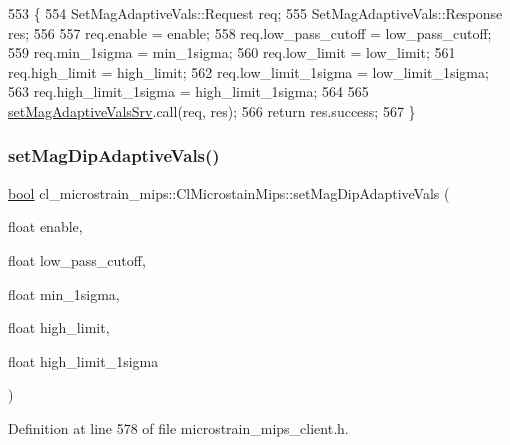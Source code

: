 \begin{DoxyCode}
553     \{
554         SetMagAdaptiveVals::Request req;
555         SetMagAdaptiveVals::Response res;
556 
557         req.enable = enable;
558         req.low\_pass\_cutoff = low\_pass\_cutoff;
559         req.min\_1sigma = min\_1sigma;
560         req.low\_limit = low\_limit;
561         req.high\_limit = high\_limit;
562         req.low\_limit\_1sigma = low\_limit\_1sigma;
563         req.high\_limit\_1sigma = high\_limit\_1sigma;
564 
565         \hyperlink{classcl__microstrain__mips_1_1ClMicrostainMips_aeb9fb755367cd253b65bf826e421cc05}{setMagAdaptiveValsSrv}.call(req, res);
566         \textcolor{keywordflow}{return} res.success;
567     \}
\end{DoxyCode}
\mbox{\label{classcl__microstrain__mips_1_1ClMicrostainMips_a1b81980570d6ff87b58a823a73cc992d}} 
\subsubsection{\texorpdfstring{set\+Mag\+Dip\+Adaptive\+Vals()}{setMagDipAdaptiveVals()}}
{\footnotesize\ttfamily \hyperlink{classbool}{bool} cl\+\_\+microstrain\+\_\+mips\+::\+Cl\+Microstain\+Mips\+::set\+Mag\+Dip\+Adaptive\+Vals (\begin{DoxyParamCaption}\item[{float}]{enable,  }\item[{float}]{low\+\_\+pass\+\_\+cutoff,  }\item[{float}]{min\+\_\+1sigma,  }\item[{float}]{high\+\_\+limit,  }\item[{float}]{high\+\_\+limit\+\_\+1sigma }\end{DoxyParamCaption})\hspace{0.3cm}{\ttfamily [inline]}}



Definition at line 578 of file microstrain\+\_\+mips\+\_\+client.\+h.


